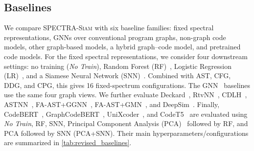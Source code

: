 \documentclass[final,5p,times,twocolumn]{elsarticle}
\newcommand{\method}{\textsc{SPECTRA-Siam}}
\theoremstyle{plain}
\begin{document}
\subsection{Baselines}
\label{sec:revised_baselines}
We compare \method{} with six baseline families: fixed spectral
representations, GNNs over conventional program graphs, non-graph code models, other graph-based models, a hybrid graph--code model, and pretrained code models. For the fixed spectral representations, we consider four downstream settings: no training (\emph{No Train}), Random Forest (RF)~\cite{??}, Logistic Regression (LR)~\cite{??}, and a Siamese Neural Network (SNN)~\cite{??}. Combined with AST, CFG, DDG, and CPG, this gives 16 fixed-spectrum configurations. The GNN~\cite{??} baselines use the same four graph views. We further evaluate Deckard~\cite{??}, RtvNN~\cite{??}, CDLH~\cite{??}, ASTNN~\cite{??}, FA-AST+GGNN~\cite{??}, FA-AST+GMN~\cite{??}, and DeepSim~\cite{??}. Finally, CodeBERT~\cite{??}, GraphCodeBERT~\cite{??}, UniXcoder~\cite{??}, and CodeT5~\cite{??} are evaluated using \emph{No Train}, RF, SNN, Principal Component Analysis (PCA)~\cite{??} followed by RF, and PCA followed by SNN (PCA+SNN). Their main hyperparameters/configurations are summarized in \autoref{tab:revised_baselines}.
\end{document}
